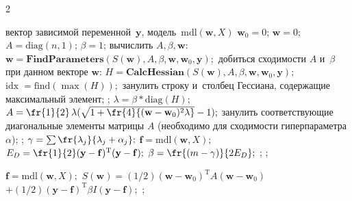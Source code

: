 \begin{multicols}{2}
\begin{algorithmic}
\REQUIRE вектор зависимой переменной~$\mathbf{y}$, модель~$\text{mdl}(\mathbf{w}, X)$
\STATE $\mathbf{w}_0=0$;
\STATE $\mathbf{w}=0$;
\STATE $A = \text{diag}(n,1)$;
\STATE $\beta=1$;
 вычислить $A, \beta, \mathbf{w}:$
    \STATE$\mathbf{w}=\textbf{FindParameters}(S(\mathbf{w}), A, \beta, \mathbf{w}, \mathbf{w}_0, \mathbf{y});$
     добиться сходимости $A$ и~$\beta$ при данном векторе $\mathbf{w}$:
            \STATE$H=\textbf{CalcHessian}(S(\mathbf{w}), A, \beta, \mathbf{w}, \mathbf{w}_0, \mathbf{y});$
                \STATE$\mathrm{idx}\;= \text{find} (\max(H));$ 
                \STATE занулить строку и~столбец Гессиана, содержащие максимальный элемент;
            \ENDIF
            \EXIT ;
            \STATE$\lambda=\beta*\text{diag}(H);$
            \STATE$A=\fr{1}{2}\,\lambda(\sqrt{1+\fr{4}{(\mathbf{w}-\mathbf{w}_0)^{2}\lambda}}-1);$
                \STATE занулить соответствующие диагональные элементы матрицы $A$ (необходимо для сходимости гиперпараметра $\alpha$);
            \ENDIF
            \EXIT ;
            \STATE$\gamma=\sum \fr{\lambda_j}{\lambda_j + \alpha_j};$
            \STATE$\mathbf{f}=\text{mdl}(\mathbf{w},X);$
            \STATE$E_D=\fr{1}{2}(\mathbf{y}-\mathbf{f})^{\mathrm{T}}(\mathbf{y}-\mathbf{f});$
            \STATE$\beta = \fr{(m - \gamma)}{2 E_D};$
            \ENDIF
            \EXIT ;
            \ENDIF
            \EXIT;
    \ENDFOR
    \ENDIF
\ENDFOR
\OUT
\end{algorithmic}

\vspace*{-12pt}

\begin{algorithmic}
        \STATE$\mathbf{f} = \text{mdl}(\mathbf{w}, X);$
        \STATE$S(\mathbf{w}) = ({1}/{2})(\mathbf{w}-\mathbf{w}_0)^{\mathrm{T}}
        A(\mathbf{w}-\mathbf{w}_0)$
        \STATE$+({1}/{2})(\mathbf{y}-\mathbf{f})^{\mathrm{T}}\beta I(\mathbf{y}-\mathbf{f});$
    \ENDWHILE
    \EXIT ;
\end{algorithmic}


\end{multicols}
